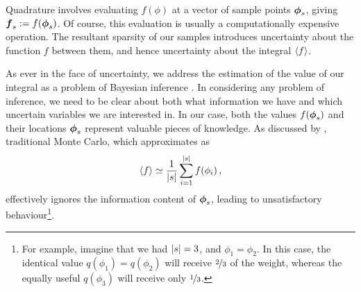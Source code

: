 \documentclass{article}
\begin{document}
Quadrature involves evaluating $f(\phi)$ at a
vector of sample points $\vph_s$, giving $\vf\pha_s\deq
f(\vph_s)$. Of course, this evaluation is usually a computationally expensive
operation.
The resultant sparsity of our samples introduces uncertainty about the function $f$ between them, and hence uncertainty about the integral $\inty{f}$.

As ever in the face of uncertainty, we address the estimation of the value of our integral as a problem of Bayesian inference \citep{BZNumericalAnalysis}. In considering any problem of inference, we need to be clear about both what information we have and which uncertain variables we are interested in. In our case, both the values $f(\vphS)$ and their locations $\vphS$ represent valuable pieces of knowledge. As discussed by \citet{MCUnsound}, traditional Monte Carlo, which approximates as
\begin{equation} \label{eq:MC_integral_estimate}
\inty{f} \simeq \frac{1}{\card{s}} \sum_{i=1}^{\card{s}} f(\phi_i)\,,
\end{equation}
effectively ignores the information content of $\vphS$, leading to unsatisfactory behaviour\footnote{
  For example, imagine that we had $\card{s}=3$, and $\phi_1 = \phi_2$. In this case, the identical value $q(\phi_1)= q(\phi_2)$ will receive $\nicefrac{2}{3}$ of the weight, whereas the equally useful $q(\phi_3)$ will receive only $\nicefrac{1}{3}$.}.

\end{document}
